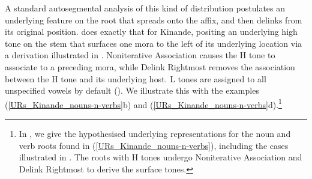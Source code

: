 A standard autosegmental analysis of this kind of distribution  postulates an underlying feature on the root that spreads onto the affix, and then delinks from its original position. \citet{Mutaka:1994} does exactly that for Kinande, positing an underlying high tone on the stem that surfaces one mora to the left of its underlying location via a derivation  illustrated in . Noniterative Association causes the H tone to associate to a preceding mora, while Delink Rightmost removes the association between the H tone and its underlying host. L tones are assigned to all unspecified vowels by default (\citealt{Pulleyblank:1986}). We illustrate this with the examples  (\ref{URs_Kinande_nouns-n-verbs}b) and  (\ref{URs_Kinande_nouns-n-verbs}d).\footnote{In , we give the hypothesised underlying representations for the noun and verb roots found in (\ref{URs_Kinande_nouns-n-verbs}), including the cases illustrated in . The roots with H tones undergo Noniterative Association and Delink Rightmost to derive the surface tones.}



